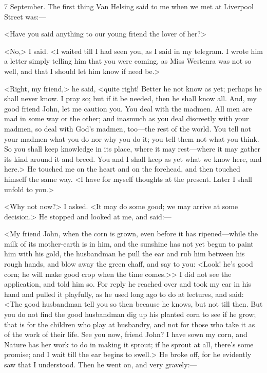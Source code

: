 \begin{diary}{7 September.}
The first thing Van Helsing said to me when we met at Liverpool Street was:—

<Have you said anything to our young friend the lover of her?>

<No,> I said. <I waited till I had seen you, as I said in my telegram. I wrote him a letter simply telling him that you were coming, as Miss Westenra was not so well, and that I should let him know if need be.>

<Right, my friend,> he said, <quite right! Better he not know as yet; perhaps he shall never know. I pray so; but if it be needed, then he shall know all. And, my good friend John, let me caution you. You deal with the madmen. All men are mad in some way or the other; and inasmuch as you deal discreetly with your madmen, so deal with God's madmen, too—the rest of the world. You tell not your madmen what you do nor why you do it; you tell them not what you think. So you shall keep knowledge in its place, where it may rest—where it may gather its kind around it and breed. You and I shall keep as yet what we know here, and here.> He touched me on the heart and on the forehead, and then touched himself the same way. <I have for myself thoughts at the present. Later I shall unfold to you.>

<Why not now?> I asked. <It may do some good; we may arrive at some decision.> He stopped and looked at me, and said:—

<My friend John, when the corn is grown, even before it has ripened—while the milk of its mother-earth is in him, and the sunshine has not yet begun to paint him with his gold, the husbandman he pull the ear and rub him between his rough hands, and blow away the green chaff, and say to you: <Look! he's good corn; he will make good crop when the time comes.>> I did not see the application, and told him so. For reply he reached over and took my ear in his hand and pulled it playfully, as he used long ago to do at lectures, and said: <The good husbandman tell you so then because he knows, but not till then. But you do not find the good husbandman dig up his planted corn to see if he grow; that is for the children who play at husbandry, and not for those who take it as of the work of their life. See you now, friend John? I have sown my corn, and Nature has her work to do in making it sprout; if he sprout at all, there's some promise; and I wait till the ear begins to swell.> He broke off, for he evidently saw that I understood. Then he went on, and very gravely:—


\end{diary}
